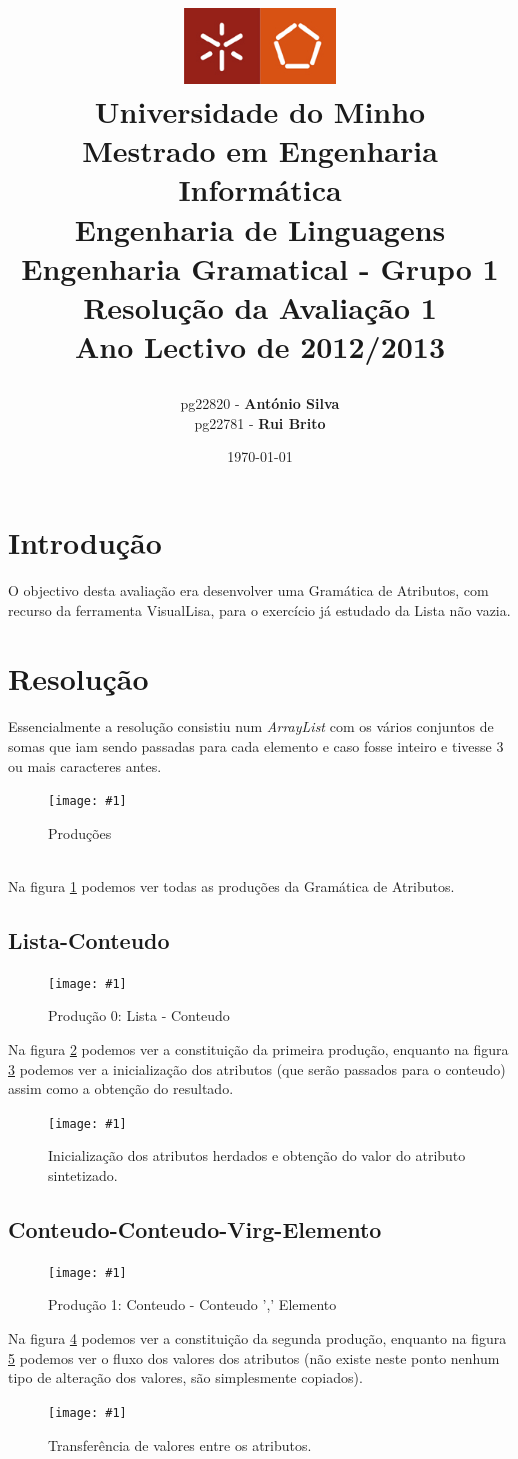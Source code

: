 \documentclass[a4paper,11pt,openright,openbib]{article}
\title{
	\large{\includegraphics[width=0.3\textwidth]{../../../report-template/UM.jpg}} \\
	\large{Universidade do Minho}  \\
	\large{Mestrado em Engenharia Informática}  \\
	\large{Engenharia de Linguagens}  \\
	\large{Engenharia Gramatical - Grupo 1}  \\	
	\large{\textbf{Resolução da Avaliação 1}} \\
	\large{Ano Lectivo de 2012/2013} \\
	\date{\today}
}
\author{	
	\begin{tabular}[t]{c c}      
        pg22820 - \textbf{António Silva} \\        
		pg22781 - \textbf{Rui Brito} \\   				
	\\ 
	\end{tabular}
}
\newcommand{\addimg}[3]{\begin{figure}[h!]
	\begin{center}
		\texttt{[image: \#1]}
	\end{center}	
	\caption{\label{#2}#3}
\end{figure}
}
\begin{document}
\maketitle


\pagestyle{headings}
\newpage
\tableofcontents
\newpage

\section{Introdução}
O objectivo desta avaliação era desenvolver uma Gramática de Atributos, com recurso da ferramenta VisualLisa, para o exercício
já estudado da Lista não vazia.
\section{Resolução}
Essencialmente a resolução consistiu num \emph{ArrayList} com os vários conjuntos de somas que iam sendo passadas para cada
elemento e caso fosse inteiro e tivesse 3 ou mais caracteres antes.
\addimg{../imgs/NEList.png}{producoes}{Produções}
\\Na figura \ref{producoes} podemos ver todas as produções da Gramática de Atributos.

\subsection{Lista-Conteudo}
\addimg{../imgs/lista-conteudo.png}{lista_conteudo}{Produção 0: Lista - Conteudo}
Na figura \ref{lista_conteudo} podemos ver a constituição da primeira produção, enquanto na figura \ref{fn1_lista_conteudo}
podemos ver a inicialização dos atributos (que serão passados para o conteudo) assim como a obtenção do resultado.
\addimg{../imgs/fn1_lista-conteudo.png}{fn1_lista_conteudo}{Inicialização dos atributos herdados e obtenção do valor do atributo sintetizado.}

\subsection{Conteudo-Conteudo-Virg-Elemento}
\addimg{../imgs/conteudo-conteudo-virg-elemento.png}{conteudo_conteudo_virg_elemento}{Produção 1: Conteudo - Conteudo ',' Elemento}
Na figura \ref{conteudo_conteudo_virg_elemento} podemos ver a constituição da segunda produção, enquanto na figura 
\ref{fn1_conteudo_conteudo_virg_elemento} podemos ver o fluxo dos valores dos atributos (não existe neste ponto nenhum tipo
de alteração dos valores, são simplesmente copiados).
\addimg{../imgs/fn1_conteudo-conteudo-virg-elemento.png}{fn1_conteudo_conteudo_virg_elemento}{Transferência de valores entre os atributos.}
\end{document}

